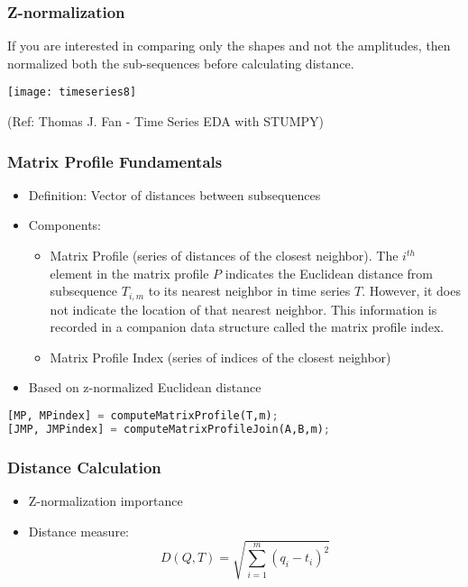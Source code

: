 \begin{frame}[fragile]\frametitle{Z-normalization}
If you are interested in comparing only the shapes and not the amplitudes, then normalized both the sub-sequences before calculating distance.

      \begin{center}

        \texttt{[image: timeseries8]}

		{\tiny (Ref: Thomas J. Fan - Time Series EDA with STUMPY)}		
        \end{center}
	
\end{frame}

\begin{frame}[fragile]\frametitle{Matrix Profile Fundamentals}
    \begin{itemize}
        \item Definition: Vector of distances between subsequences
        \item Components:
            \begin{itemize}
                \item Matrix Profile (series of distances of the closest neighbor). The  $i^{th}$   element  in  the  matrix  profile  $P$  indicates  the  Euclidean  distance  from subsequence $T_{i,m}$  to its nearest neighbor in time series $T$. However, it does not indicate the  location  of  that  nearest  neighbor.  This  information  is  recorded  in  a  companion data structure called the matrix profile index.
                \item Matrix Profile Index (series of indices of the closest neighbor)
            \end{itemize}
        \item Based on z-normalized Euclidean distance
    \end{itemize}
\begin{lstlisting}[language=Python]
[MP, MPindex] = computeMatrixProfile(T,m);        
[JMP, JMPindex] = computeMatrixProfileJoin(A,B,m); 
\end{lstlisting}

\end{frame}

\begin{frame}[fragile]\frametitle{Distance Calculation}
    \begin{itemize}
        \item Z-normalization importance
        \item Distance measure:
            \begin{equation*}
            D(Q,T) = \sqrt{\sum_{i=1}^{m}(q_i - t_i)^2}
            \end{equation*}
    \end{itemize}
	
	
\end{frame}

